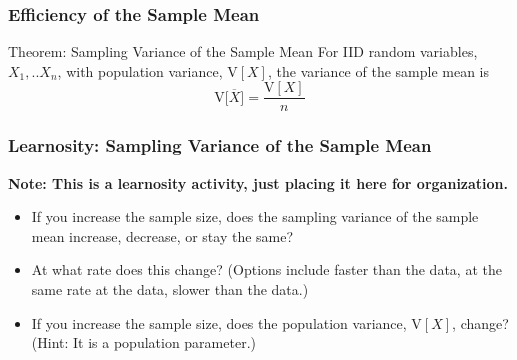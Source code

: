 \documentclass[12pt, block=fill]{beamer}
\newcommand{\V}{\text{V}}
\begin{document}
\begin{frame}[t]
  \frametitle{Efficiency of the Sample Mean}
  \begin{block}{Theorem: Sampling Variance of the Sample Mean}
    For IID random variables, $X_1,..X_n$, with population variance, $\V[X]$, the variance of the sample mean is
     \[
        \V\big[\overline{X}\big] = \frac{\V[X]}{n}
      \]
    \end{block}
    \note[item]{  $      \V\big[\overline{X}\big]  = \V[ \frac{1}{n} (X_1 + X_2 +...+X_n)] $}
    \note[item]{$= \frac{1}{n^2} ( \V[X_1] + ... + \V[X_n] ) = \frac{\V[X] }{n} $}
\end{frame}

\begin{frame}
  \frametitle{Learnosity: Sampling Variance of the Sample Mean}
  \textbf{Note: This is a learnosity activity, just placing it here
    for organization.}

  \begin{itemize}
  \item If you increase the sample size, does the sampling variance of
    the sample mean increase, decrease, or stay the same?
  \item At what rate does this change? (Options include faster than
    the data, at the same rate at the data, slower than the data.)
  \item If you increase the sample size, does the population variance,
    $\V[X]$, change? (Hint: It is a population parameter.)
  \end{itemize}
\end{frame}

\end{document}
